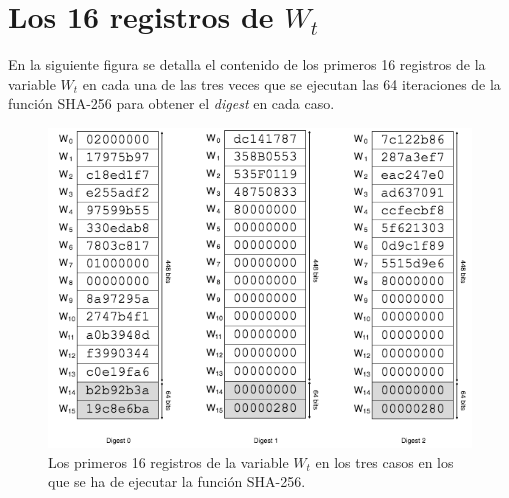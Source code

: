 \documentclass{article}
\begin{document}
\section{Los 16 registros de $W_t$}
    En la siguiente figura se detalla el contenido de los primeros 16 registros de la variable $W_{t}$ en cada una de las tres veces que se ejecutan las 64 iteraciones de la función SHA-256 para obtener el \textit{digest} en cada caso.
    \begin{figure}[H]
    \centering
        \includegraphics[scale=0.59]{img/Bitcoin_block_SHA_256_W0_W15_x3}
        \caption{Los primeros 16 registros de la variable $W_{t}$ en los tres casos en los que se ha de ejecutar la función SHA-256.}
    \end{figure}
    
\end{document}
